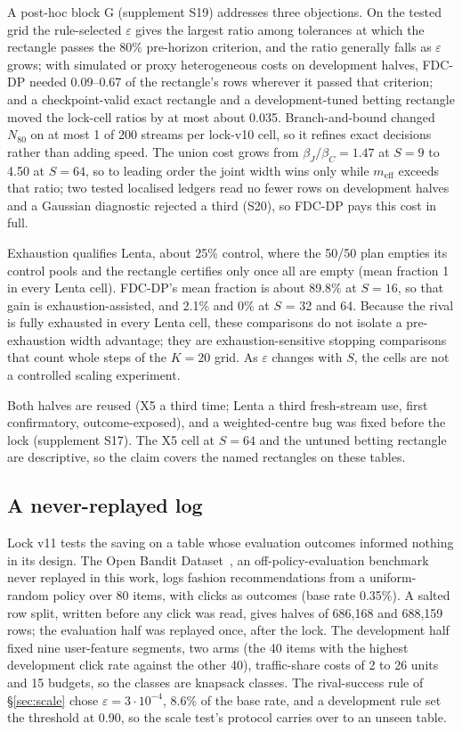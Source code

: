 \documentclass[sigconf,anonymous,review]{acmart}
\newcommand{\eps}{\varepsilon}
\newcommand{\meff}{m_{\text{eff}}}
\begin{document}
A post-hoc block G (supplement S19) addresses three objections. On the tested grid the rule-selected $\eps$ gives the largest ratio among tolerances at which the rectangle passes the 80\% pre-horizon criterion, and the ratio generally falls as $\eps$ grows; with simulated or proxy heterogeneous costs on development halves, FDC-DP needed 0.09--0.67 of the rectangle's rows wherever it passed that criterion; and a checkpoint-valid exact rectangle and a development-tuned betting rectangle moved the lock-cell ratios by at most about 0.035. Branch-and-bound changed $N_{80}$ on at most 1 of 200 streams per lock-v10 cell, so it refines exact decisions rather than adding speed. The union cost grows from $\beta_J/\beta_C = 1.47$ at $S = 9$ to 4.50 at $S = 64$, so to leading order the joint width wins only while $\meff$ exceeds that ratio; two tested localised ledgers read no fewer rows on development halves and a Gaussian diagnostic rejected a third (S20), so FDC-DP pays this cost in full.

Exhaustion qualifies Lenta, about 25\% control, where the 50/50 plan empties its control pools and the rectangle certifies only once all are empty (mean fraction 1 in every Lenta cell). FDC-DP's mean fraction is about 89.8\% at $S = 16$, so that gain is exhaustion-assisted, and 2.1\% and 0\% at $S$ = 32 and 64. Because the rival is fully exhausted in every Lenta cell, these comparisons do not isolate a pre-exhaustion width advantage; they are exhaustion-sensitive stopping comparisons that count whole steps of the $K = 20$ grid. As $\eps$ changes with $S$, the cells are not a controlled scaling experiment.

Both halves are reused (X5 a third time; Lenta a third fresh-stream use, first confirmatory, outcome-exposed), and a weighted-centre bug was fixed before the lock (supplement S17). The X5 cell at $S = 64$ and the untuned betting rectangle are descriptive, so the claim covers the named rectangles on these tables.

\subsection{A never-replayed log}\label{sec:obd}

Lock v11 tests the saving on a table whose evaluation outcomes informed nothing in its design. The Open Bandit Dataset~\citep{saito2021open}, an off-policy-evaluation benchmark never replayed in this work, logs fashion recommendations from a uniform-random policy over 80 items, with clicks as outcomes (base rate 0.35\%). A salted row split, written before any click was read, gives halves of 686,168 and 688,159 rows; the evaluation half was replayed once, after the lock. The development half fixed nine user-feature segments, two arms (the 40 items with the highest development click rate against the other 40), traffic-share costs of 2 to 26 units and 15 budgets, so the classes are knapsack classes. The rival-success rule of \S\ref{sec:scale} chose $\eps = 3 \cdot 10^{-4}$, 8.6\% of the base rate, and a development rule set the threshold at 0.90, so the scale test's protocol carries over to an unseen table.
\end{document}

